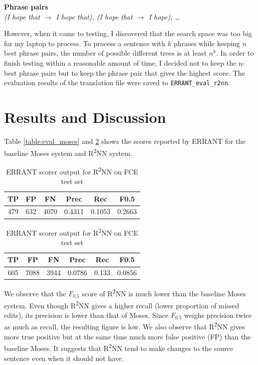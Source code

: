 \documentclass[12pt,a4paper,twoside,openright]{report}
\begin{document}
\textbf{Phrase pairs}\\
\textit{(I hope that $\rightarrow$ I hope that),
        (I hope that $\rightarrow$ I hope),
        \dots}

However, when it came to testing, I discovered that the search space was too big for my laptop to process. To process a sentence with $k$ phrases while keeping $n$ best phrase pairs, the number of possible different trees is at least $n^k$. In order to finish testing within a reasonable amount of time, I decided not to keep the n-best phrase pairs but to keep the phrase pair that gives the highest score. The evaluation results of the translation file were saved to \texttt{ERRANT\_eval\_r2nn}.

\section{Results and Discussion}\label{section:results}
Table \ref{table:eval_moses} and \ref{table:eval_r2nn} shows the scores reported by ERRANT for the baseline Moses system and R\textsuperscript{2}NN system.

\begin{table}[ht]
    \centering
    \begin{tabular}{ |c|c|c|c|c|c| } 
     \hline
     TP & FP & FN & Prec & Rec & F0.5 \\ [0.5ex] 
     \hline
     479 & 632 & 4070 & 0.4311 & 0.1053 & 0.2663 \\ 
     \hline
    \end{tabular}
    \caption{ERRANT scorer output for Moses on FCE test set}
    \label{table:eval_moses}
    
    \vspace{1em}
    
    \begin{tabular}{ |c|c|c|c|c|c| } 
     \hline
     TP & FP & FN & Prec & Rec & F0.5 \\ [0.5ex] 
     \hline
     605 & 7088 & 3944 & 0.0786 & 0.133 & 0.0856 \\ 
     \hline
    \end{tabular}
    \caption{ERRANT scorer output for R\textsuperscript{2}NN on FCE test set}
    \label{table:eval_r2nn}
\end{table}

We observe that the $F_{0.5}$ score of R\textsuperscript{2}NN is much lower than the baseline Moses system. Even though R\textsuperscript{2}NN gives a higher recall (lower proportion of missed edits), its precision is lower than that of Moses. Since $F_{0.5}$ weighs precision twice as much as recall, the resulting figure is low. We also observe that R\textsuperscript{2}NN gives more true positive but at the same time much more false positive (FP) than the baseline Moses. It suggests that R\textsuperscript{2}NN tend to make changes to the source sentence even when it should not have. 
\end{document}

